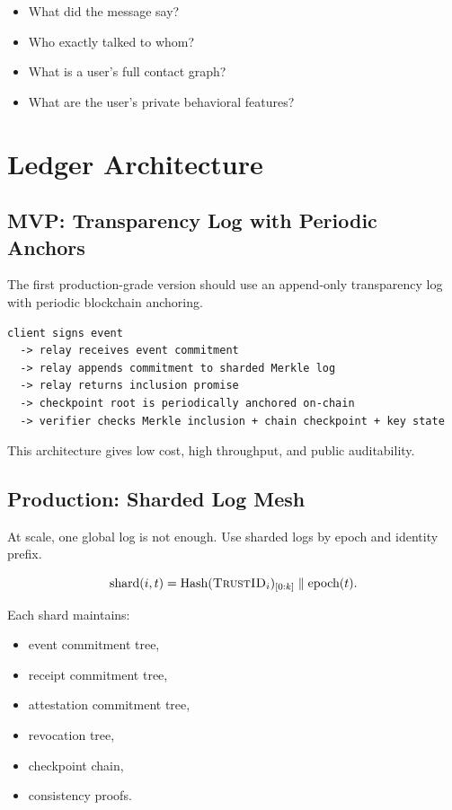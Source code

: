 \documentclass[11pt]{article}
\newcommand{\TrustID}{\textsc{TrustID}}
\newcommand{\hash}{\operatorname{Hash}}
\begin{document}
\begin{itemize}
    \item What did the message say?
    \item Who exactly talked to whom?
    \item What is a user's full contact graph?
    \item What are the user's private behavioral features?
\end{itemize}

\section{Ledger Architecture}

\subsection{MVP: Transparency Log with Periodic Anchors}

The first production-grade version should use an append-only transparency log with periodic blockchain anchoring.

\begin{lstlisting}[style=tslcode]
client signs event
  -> relay receives event commitment
  -> relay appends commitment to sharded Merkle log
  -> relay returns inclusion promise
  -> checkpoint root is periodically anchored on-chain
  -> verifier checks Merkle inclusion + chain checkpoint + key state
\end{lstlisting}

This architecture gives low cost, high throughput, and public auditability.

\subsection{Production: Sharded Log Mesh}

At scale, one global log is not enough. Use sharded logs by epoch and identity prefix.

\begin{equation}
\text{shard}(i,t) = \hash(\TrustID_i)_{[0:k]} \parallel \text{epoch}(t).
\end{equation}

Each shard maintains:

\begin{itemize}
    \item event commitment tree,
    \item receipt commitment tree,
    \item attestation commitment tree,
    \item revocation tree,
    \item checkpoint chain,
    \item consistency proofs.
\end{itemize}
\end{document}
